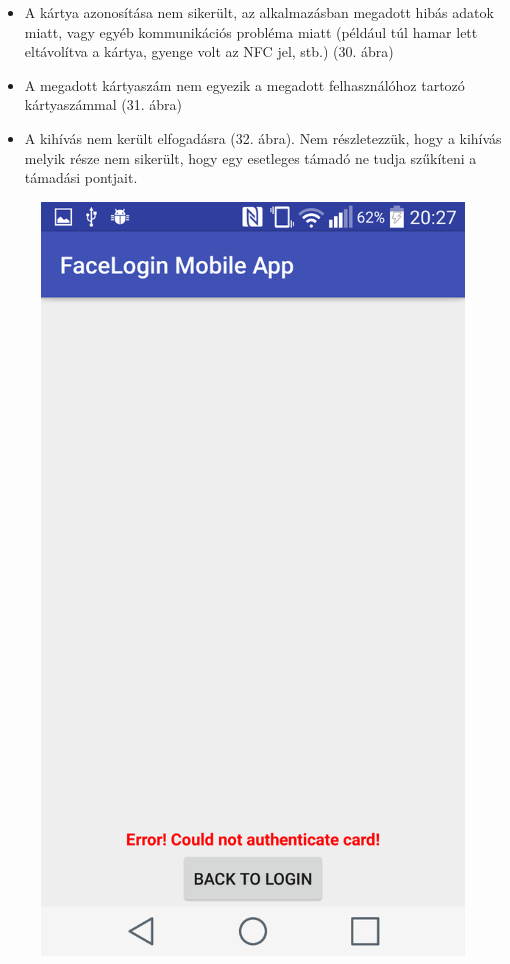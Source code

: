 \begin{itemize}
\item A kártya azonosítása nem sikerült, az alkalmazásban megadott hibás adatok miatt, vagy egyéb kommunikációs probléma miatt (például túl hamar lett eltávolítva a kártya, gyenge volt az NFC jel, stb.) (30. ábra)
\item A megadott kártyaszám nem egyezik a megadott felhasználóhoz tartozó kártyaszámmal (31. ábra)
\item A kihívás nem került elfogadásra (32. ábra). Nem részletezzük, hogy a kihívás melyik része nem sikerült, hogy egy esetleges támadó ne tudja szűkíteni a támadási pontjait.
\end{itemize}

\begin{figure}[h]
 \begin{minipage}{.30\textwidth} 
\centering
    \includegraphics[scale=0.10]{img/card_auth_fail}

\end{minipage}
\end{figure}
